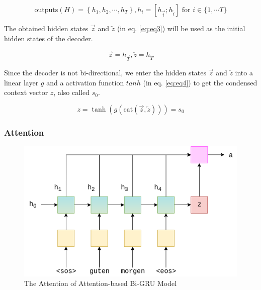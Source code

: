 \begin{equation}
    \text{outputs} (H) = \left\{h_1, h_2, \cdots, h_T\right\}, h_i = [h_{\overrightarrow{i}}; h_{\overleftarrow{i}}] \text{ for } i \in \{1,\cdots T\}
    \label{eq:eq2}
\end{equation}

The obtained hidden states $\overrightarrow{z}$ and $\overleftarrow{z}$ (in eq. \ref{eq:eq3}) will be used as the initial hidden states of the decoder. 

\begin{equation}
    \overrightarrow{z} = h_{\overrightarrow{T}},
    \overleftarrow{z} = h_{\overleftarrow{T}}
    \label{eq:eq3}
\end{equation}

Since the decoder is not bi-directional, we enter the hidden states $\overrightarrow{z}$ and $\overleftarrow{z}$ into a linear layer $g$ and a activation function $tanh$ (in eq. \ref{eq:eq4}) to get the condensed context vector $z$, also called $s_0$.

\begin{equation}
    z = \tanh(g(\text{cat}(\overrightarrow{z}, \overleftarrow{z}))) = s_0
    \label{eq:eq4}
\end{equation}

\subsubsection{Attention}

\begin{figure}[h]
	\centering
	\includegraphics[scale=0.7]{../images/seq2seq_encoder_attention.png}
    \caption{The Attention of Attention-based Bi-GRU Model}
	\label{fig:seq2seq_attention}
\end{figure}


